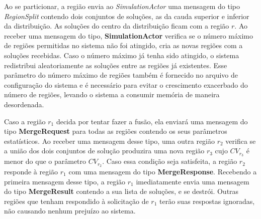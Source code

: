 Ao se particionar, a região envia ao \textit{SimulationActor} uma mensagem do tipo \textit{RegionSplit} contendo dois conjuntos de soluções, as da cauda superior e inferior da distribuição. As soluções do centro da distribuição ficam com a região $r$. Ao receber uma mensagem do tipo, \textbf{SimulationActor} verifica se o número máximo de regiões permitidas no sistema não foi atingido, cria as novas regiões com a soluções recebidas. Caso o número máximo já tenha sido atingido, o sistema redistribui aleatoriamente as soluções entre as regiões já existentes. Esse parâmetro do número máximo de regiões também é fornecido no arquivo de configuração do sistema e é necessário para evitar o crescimento exacerbado do número de regiões, levando o sistema a consumir memória de maneira desordenada. 

Caso a região $r_1$ decida por tentar fazer a fusão, ela enviará uma mensagem do tipo \textbf{MergeRequest} para todas as regiões contendo os seus parâmetros estatísticos. Ao receber uma mensagem desse tipo, uma outra região $r_2$ verifica se a união dos dois conjuntos de solução produzira uma nova região $r_3$ cujo $CV_{r_3}$ é menor do que o parâmetro $CV_{r_2}$. Caso essa condição seja satisfeita, a região $r_2$ responde à região $r_1$ com uma mensagem do tipo \textbf{MergeResponse}. Recebendo a primeira mensagem desse tipo, a região $r_1$ imediatamente envia uma mensagem do tipo \textbf{MergeResult} contendo a sua lista de soluções, e se destrói. Outras regiões que tenham respondido à solicitação de $r_1$ terão suas respostas ignoradas, não causando nenhum prejuízo ao sistema.

